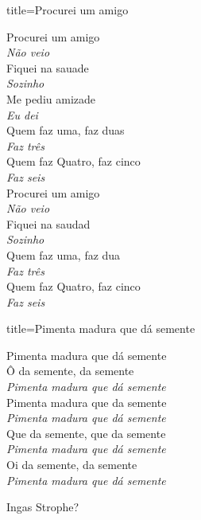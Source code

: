 \documentclass[fontsize=14pt, paper=a4, twoside, DIV=20]{scrreprt} %
\begin{document}
\begin{multicols*}{2}
\begin{song}{title={Procurei um amigo }}
        \begin{verse*}
            Procurei um amigo\\
            \textit{Não veio}\\
            Fiquei na sauade\\
            \textit{Sozinho}\\
            Me pediu amizade\\
            \textit{Eu dei}\\
            Quem faz uma, faz duas\\
            \textit{Faz três}\\
            Quem faz Quatro, faz cinco\\
            \textit{Faz seis}\\
            Procurei um amigo\\
            \textit{Não veio}\\
            Fiquei na saudad\\
            \textit{Sozinho}\\
            Quem faz uma, faz dua\\
            \textit{Faz três}\\
            Quem faz Quatro, faz cinco\\
            \textit{Faz seis}\\
        \end{verse*}
\end{song}
\begin{song}{title={Pimenta madura que dá semente}}
        \begin{verse*}
            Pimenta madura que dá semente\\
            Ô da semente, da semente\\
            \textit{Pimenta madura que dá semente}\\
            Pimenta madura que da semente\\
            \textit{Pimenta madura que dá semente}\\
            Que da semente, que da semente\\
            \textit{Pimenta madura que dá semente}\\
            Oi da semente, da semente\\
            \textit{Pimenta madura que dá semente}\\

        \end{verse*}
        \begin{verse*}
     Ingas Strophe?
        \end{verse*}
\end{song}



\end{multicols*}
\end{document}
